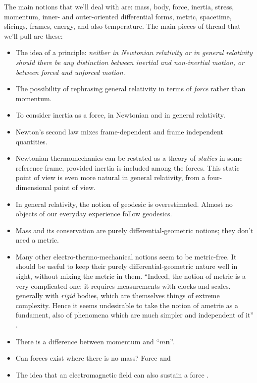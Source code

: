 \documentclass[\ifafour a4paper,12pt,\else a5paper,10pt,\fi%
onecolumn,oneside,article,%
british%
]{memoir}
\theoremstyle{remark}
\theoremstyle{innote}
\newcommand*{\citep}{\parencites}
\renewcommand*{\cites}{\parencites}
\renewcommand*{\|}{\nonscript\,\vert\nonscript\;\mathopen{}}
\newcommand*{\sect}{\S}%
\newcommand*{\yvv}{n}
\newcommand*{\yv}{\bm{\yvv}}
\begin{document}
The main notions that we'll deal with are: mass, body, force, inertia,
stress, momentum, inner- and outer-oriented differential forms, metric,
spacetime, slicings, frames, energy, and also temperature. The main pieces
of thread that we'll pull are these:
\begin{itemize}
\item The idea of a principle: \emph{neither in Newtonian relativity or in
    general relativity should there be any distinction between inertial and
    non-inertial motion, or between forced and unforced motion}.
\item The possibility of rephrasing general relativity in terms of
  \emph{force} rather than momentum.
\item To consider inertia as a force, in Newtonian and in general
  relativity.
\item Newton's second law mixes frame-dependent and frame independent
  quantities.
\item Newtonian thermomechanics can be restated as a theory of
  \emph{statics} in some reference frame, provided inertia is included
  among the forces. This static point of view is even more natural in
  general relativity, from a four-dimensional point of view.
\item In general relativity, the notion of geodesic is overestimated.
  Almost no objects of our everyday experience follow geodesics.
\item Mass and its conservation are purely differential-geometric notions;
  they don't need a metric.
\item Many other electro-thermo-mechanical notions seem to be metric-free.
  It should be useful to keep their purely differential-geometric nature
  well in sight, without mixing the metric in them. \enquote{Indeed, the
    notion of metric is a very complicated one: it requires measurements
    with clocks and scales. generally with \emph{rigid} bodies, which are
    themselves things of extreme complexity. Hence it seems undesirable to
    take the notion of ametrie as a fundament, also of phenomena which are
    much simpler and independent of it} \citep[\sect~1,
  pp.~521--522]{vandantzig1934b}.
\item There is a difference between momentum and \enquote{$m\yv$}.
\item Can forces exist where there is no mass? Force and
\item The idea that an electromagnetic field can also sustain a force
  \cites[\sect~158, pp.~534--535]{page1928_r1958}{ericksen2007}.
\end{itemize}
\end{document}
